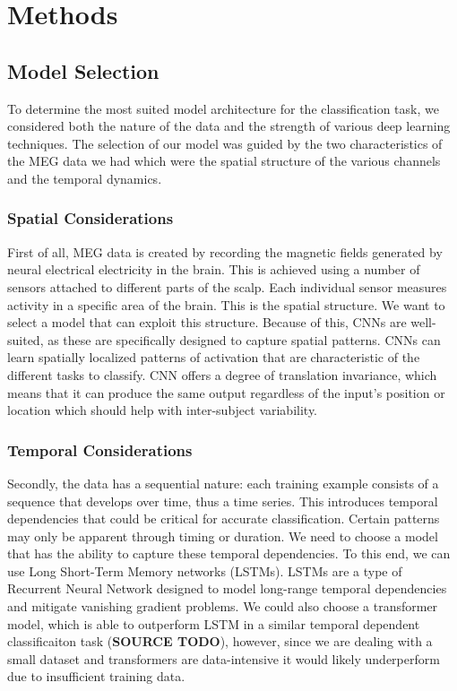 \documentclass[conference]{IEEEtran}
\begin{document}
\section{Methods}

\subsection{Model Selection}
To determine the most suited model architecture for the classification task, we considered both the nature of the data and the strength of various deep learning techniques.
 The selection of our model was guided by the two characteristics of the MEG data we had which were the spatial structure of the various channels and the temporal dynamics.

\subsubsection{Spatial Considerations}
First of all, MEG data is created by recording the magnetic fields generated by neural electrical electricity in the brain.
 This is achieved using a number of sensors attached to different parts of the scalp. Each individual sensor measures activity 
 in a specific area of the brain. This is the spatial structure. We want to select a model that can exploit this structure.
  Because of this, CNNs are well-suited, as these are specifically designed to capture spatial patterns.
CNNs can learn spatially localized patterns of activation that are characteristic of the different tasks to classify. 
CNN offers a degree of translation invariance, which means that it can produce the same output regardless of the input's position or location which should help with inter-subject variability. 

\subsubsection{Temporal Considerations}
Secondly, the data has a sequential nature: each training example consists of a sequence that develops over time, thus a time series.
 This introduces temporal dependencies that could be critical for accurate classification. 
 Certain patterns may only be apparent through timing or duration. 
 We need to choose a model that has the ability to capture these temporal dependencies. 
 To this end, we can use Long Short-Term Memory networks \cite{yu2019review} (LSTMs). 
 LSTMs are a type of Recurrent Neural Network designed to model long-range temporal dependencies and mitigate vanishing gradient problems. We could also choose a transformer model, which is able to outperform LSTM in a similar temporal dependent classificaiton task (\textbf{SOURCE TODO}), however, since we are dealing with a small dataset and transformers are data-intensive it would likely underperform due to insufficient training data. 
\end{document}
